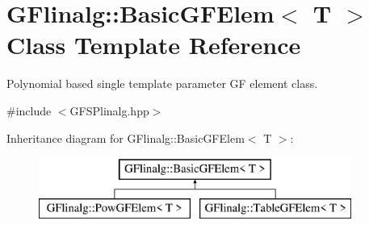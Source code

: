 \hypertarget{class_g_flinalg_1_1_basic_g_f_elem}{}\section{G\+Flinalg\+::Basic\+G\+F\+Elem$<$ T $>$ Class Template Reference}
\label{class_g_flinalg_1_1_basic_g_f_elem}


Polynomial based single template parameter GF element class.  




{\ttfamily \#include $<$G\+F\+S\+Plinalg.\+hpp$>$}

Inheritance diagram for G\+Flinalg\+::Basic\+G\+F\+Elem$<$ T $>$\+:\begin{figure}[H]
\begin{center}
\leavevmode
\includegraphics[height=2.000000cm]{class_g_flinalg_1_1_basic_g_f_elem}
\end{center}
\end{figure}
